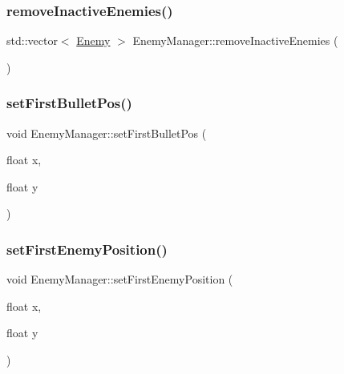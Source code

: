 \subsubsection{\texorpdfstring{remove\+Inactive\+Enemies()}{removeInactiveEnemies()}}
{\footnotesize\ttfamily std\+::vector$<$ \hyperlink{class_enemy}{Enemy} $>$ Enemy\+Manager\+::remove\+Inactive\+Enemies (\begin{DoxyParamCaption}{ }\end{DoxyParamCaption})\hspace{0.3cm}{\ttfamily [private]}}

\mbox{\label{class_enemy_manager_a217800f39e93529dc7c912857f5a4228}} 
\subsubsection{\texorpdfstring{set\+First\+Bullet\+Pos()}{setFirstBulletPos()}}
{\footnotesize\ttfamily void Enemy\+Manager\+::set\+First\+Bullet\+Pos (\begin{DoxyParamCaption}\item[{float}]{x,  }\item[{float}]{y }\end{DoxyParamCaption})\hspace{0.3cm}{\ttfamily [inline]}}

\mbox{\label{class_enemy_manager_a5aacf80c75d457dfc2274c5f3be3ca96}} 
\subsubsection{\texorpdfstring{set\+First\+Enemy\+Position()}{setFirstEnemyPosition()}}
{\footnotesize\ttfamily void Enemy\+Manager\+::set\+First\+Enemy\+Position (\begin{DoxyParamCaption}\item[{float}]{x,  }\item[{float}]{y }\end{DoxyParamCaption})\hspace{0.3cm}{\ttfamily [inline]}}

